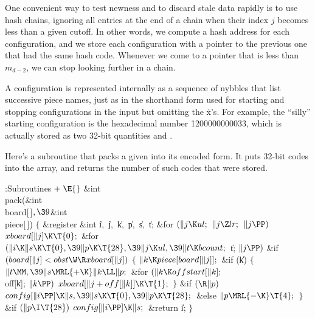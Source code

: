 One convenient way to test newness and to discard stale data rapidly
is to use hash chains, ignoring all entries at the end of a chain
when their index $j$ becomes less than a given cutoff.
In other words, we compute a hash address for each configuration,
and we store each configuration with a pointer to the previous one
that had the same hash code. Whenever we come to a pointer that is
less than $m_{d-2}$, we can stop looking further in a chain.

\fi

A configuration is represented internally as a sequence of nybbles
that list successive piece names, just as in the shorthand form
used for starting and stopping configurations in the input but
omitting the \.x's. For example, the ``silly'' starting configuration
is the hexadecimal number \.{1200000000033}, which is actually
stored as two 32-bit quantities  and .

Here's a subroutine that packs a given  into its encoded form.
It puts 32-bit codes into the  array, and returns the
number of such codes that were stored.

\Y\B\4:Subroutines\X${}\mathrel+\E{}$\6
\&{int} \\{pack}(\&{int} \\{board}[\,]${},\39{}$\&{int} \\{piece}[\,])\1\1\2\2\6
${}\{{}$\1\6
\&{register} \&{int} \|i${},{}$ \|j${},{}$ \|k${},{}$ \|p${},{}$ \|s${},{}$ %
\|t;\7
\&{for} ${}(\|j\K\\{ul};{}$ ${}\|j\Z\\{lr};{}$ ${}\|j\PP){}$\1\5
${}\\{xboard}[\|j]\K\T{0};{}$\2\6
\&{for} ${}(\|i\K\|s\K\T{0},\39\|p\K\T{28},\39\|j\K\\{ul},\39\|t\K%
\\{bcount};{}$ \|t; ${}\|j\PP){}$\1\6
\&{if} ${}(\\{board}[\|j]<\\{obst}\W\R\\{xboard}[\|j]){}$\5
${}\{{}$\1\6
${}\|k\K\\{piece}[\\{board}[\|j]];{}$\6
\&{if} (\|k)\5
${}\{{}$\1\6
${}\|t\MM,\39\|s\MRL{+{\K}}\|k\LL\|p;{}$\6
\&{for} ${}(\|k\K\\{offstart}[\|k];{}$ \\{off}[\|k]; ${}\|k\PP){}$\1\5
${}\\{xboard}[\|j+\\{off}[\|k]]\K\T{1};{}$\2\6
\4${}\}{}$\2\6
\&{if} ${}(\R\|p){}$\1\5
${}\\{config}[\|i\PP]\K\|s,\39\|s\K\T{0},\39\|p\K\T{28};{}$\2\6
\&{else}\1\5
${}\|p\MRL{-{\K}}\T{4};{}$\2\6
\4${}\}{}$\2\2\6
\&{if} ${}(\|p\I\T{28}){}$\1\5
${}\\{config}[\|i\PP]\K\|s;{}$\2\6
\&{return} \|i;\6
\4${}\}{}$\2\par
\fi


